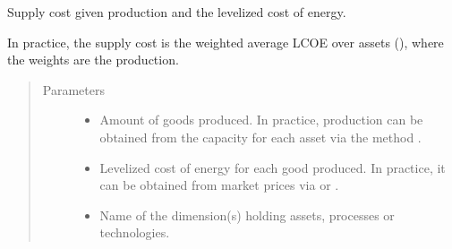 \documentclass[letterpaper,10pt,english]{sphinxmanual}
\begin{document}

\begin{fulllineitems}
\label{\detokenize{api:muse.quantities.supply_cost}}
Supply cost given production and the levelized cost of energy.

In practice, the supply cost is the weighted average LCOE over assets (),
where the weights are the production.
\begin{quote}\begin{description}
\item[{Parameters}] \leavevmode\begin{itemize}
\item {} 
 \textendash{} Amount of goods produced. In practice, production can be obtained
from the capacity for each asset via the method
.

\item {} 
 \textendash{} Levelized cost of energy for each good produced. In practice, it can be
obtained from market prices via
 or
.

\item {} 
 \textendash{} Name of the dimension(s) holding assets, processes or technologies.

\end{itemize}

\end{description}\end{quote}

\end{fulllineitems}
\end{document}
